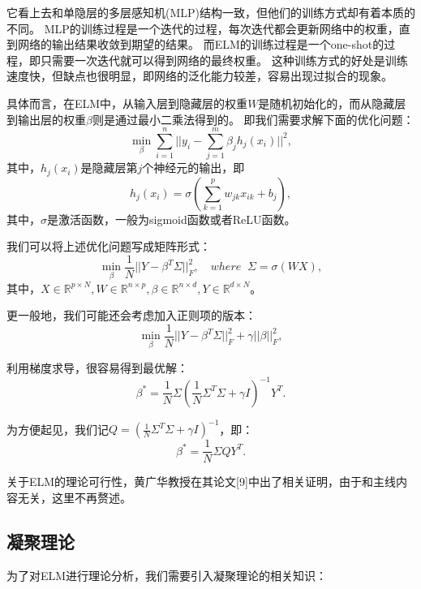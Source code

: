 \documentclass[UTF8,12pt]{ctexart}
\begin{document}
它看上去和单隐层的多层感知机(MLP)结构一致，但他们的训练方式却有着本质的不同。
MLP的训练过程是一个迭代的过程，每次迭代都会更新网络中的权重，直到网络的输出结果收敛到期望的结果。
而ELM的训练过程是一个one-shot的过程，即只需要一次迭代就可以得到网络的最终权重。
这种训练方式的好处是训练速度快，但缺点也很明显，即网络的泛化能力较差，容易出现过拟合的现象。

具体而言，在ELM中，从输入层到隐藏层的权重$W$是随机初始化的，而从隐藏层到输出层的权重$\beta$则是通过最小二乘法得到的。
即我们需要求解下面的优化问题：
\begin{equation}
    \min_{\beta} \sum_{i=1}^{n}||y_i - \sum_{j=1}^{m} \beta_j h_j(x_i)||^2,
\end{equation}
其中，$h_j(x_i)$是隐藏层第$j$个神经元的输出，即
\begin{equation}
    h_j(x_i) = \sigma(\sum_{k=1}^{p} w_{jk} x_{ik} + b_j),
\end{equation}
其中，$\sigma$是激活函数，一般为sigmoid函数或者ReLU函数。

我们可以将上述优化问题写成矩阵形式：    
\begin{equation}
    \min_{\beta} \frac{1}{N} ||Y - \beta^T \Sigma ||_F^2,
    \quad where \;\; \Sigma = \sigma(WX),
\end{equation}
其中，$X \in \mathbb{R}^{p \times N}, W \in \mathbb{R}^{n \times p}, 
\beta \in \mathbb{R}^{n \times d}, Y \in \mathbb{R}^{d \times N}$。

更一般地，我们可能还会考虑加入正则项的版本：
\begin{equation}
    \min_{\beta} \frac{1}{N} ||Y - \beta^T \Sigma ||_F^2 + \gamma ||\beta||_F^2,
\end{equation}

利用梯度求导，很容易得到最优解：
\begin{equation}
    \beta^* = \frac{1}{N} \Sigma (\frac{1}{N}\Sigma^T \Sigma + \gamma I)^{-1} Y^T.
\end{equation}

为方便起见，我们记$Q = (\frac{1}{N}\Sigma^T \Sigma + \gamma I)^{-1}$，即：
\begin{equation}
    \beta^* = \frac{1}{N} \Sigma Q Y^T.
\end{equation}

关于ELM的理论可行性，黄广华教授在其论文[9]中出了相关证明，由于和主线内容无关，这里不再赘述。

\subsection{凝聚理论}
为了对ELM进行理论分析，我们需要引入凝聚理论的相关知识：
\end{document}
